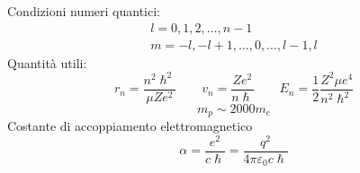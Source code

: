 Condizioni numeri quantici:
\begin{gather*}
    l = 0,1,2,\dots, n-1 \\
    m = -l,-l+1,\dots,0,\dots,l-1,l
\end{gather*}
Quantità utili:
\begin{equation*}
    r_n = \frac{n^2\hslash^2}{\mu Ze^2} \qquad v_n = \frac{Ze^2}{n\hslash} \qquad E_n = \frac{1}{2}\frac{Z^2\mu e^4}{n^2\hslash^2}
\end{equation*}
\begin{equation*}
    m_p \sim 2000 m_e
\end{equation*}
Costante di accoppiamento elettromagnetico
\begin{equation*}
    \alpha = \frac{e^2}{c\hslash} = \frac{q^2}{4\pi \varepsilon_0 c\hslash}
\end{equation*}